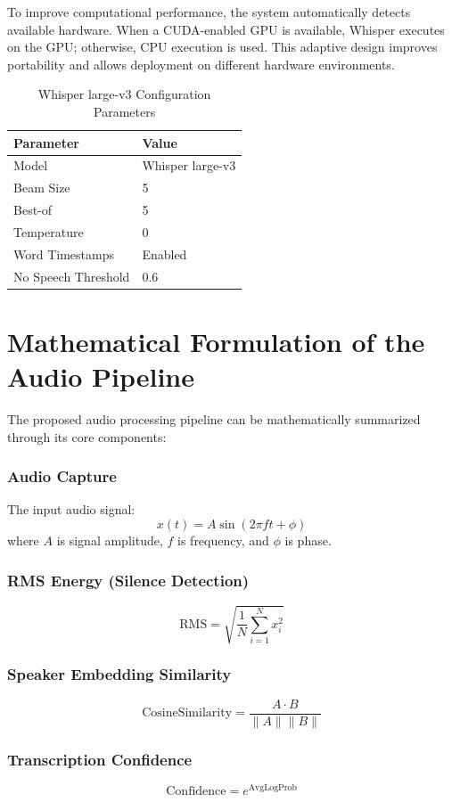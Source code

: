 \documentclass[12pt]{report}
\begin{document}
To improve computational performance, the system automatically detects available hardware. When a CUDA-enabled GPU is available, Whisper executes on the GPU; otherwise, CPU execution is used. This adaptive design improves portability and allows deployment on different hardware environments.

\begin{table}[H]
\centering
\begin{tabular}{|l|l|}
\hline
\textbf{Parameter} & \textbf{Value} \\
\hline
Model & Whisper large-v3 \\
\hline
Beam Size & 5 \\
\hline
Best-of & 5 \\
\hline
Temperature & 0 \\
\hline
Word Timestamps & Enabled \\
\hline
No Speech Threshold & 0.6 \\
\hline
\end{tabular}
\caption{Whisper large-v3 Configuration Parameters}
\label{tab:whisper_params}
\end{table}

\section{Mathematical Formulation of the Audio Pipeline}

The proposed audio processing pipeline can be mathematically summarized through its core components:

\subsubsection{Audio Capture}
The input audio signal:
\[
x(t) = A\sin(2\pi f t + \phi)
\]
where $A$ is signal amplitude, $f$ is frequency, and $\phi$ is phase.

\subsubsection{RMS Energy (Silence Detection)}
\[
\text{RMS} = \sqrt{\frac{1}{N} \sum_{i=1}^{N} x_i^2}
\]

\subsubsection{Speaker Embedding Similarity}
\[
\text{CosineSimilarity} = \frac{A \cdot B}{\|A\| \|B\|}
\]

\subsubsection{Transcription Confidence}
\[
\text{Confidence} = e^{\text{AvgLogProb}}
\]
\end{document}
